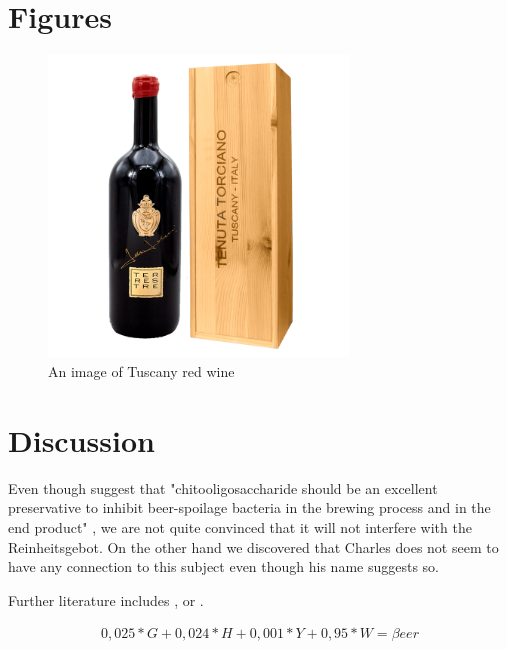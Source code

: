 \documentclass{article}
\begin{document}
\section{Figures}
\begin{figure}[htp]
    \centering
        \includegraphics[width=8cm]{redwine_tuscany.png}
    \caption{An image of Tuscany red wine }
    \label{fig:1}
\end{figure}


\newpage
\section{Discussion}
Even though \cite{Zhao2015} suggest that "chitooligosaccharide should be an excellent preservative to inhibit beer-spoilage bacteria in the brewing process and in the end product" , we are not quite convinced that it will not interfere with the Reinheitsgebot. On the other hand we discovered that Charles \cite{Beer2003} does not seem to have any connection to this subject even though his name suggests so. 

Further literature includes \cite{1982}, \cite{Tail} or \cite{corona}.

\par
\begin{align}
0,025*G + 0,024*H + 0,001*Y + 0,95*W = \beta eer
\end{align}



\newpage


\printbibliography
\end{document}
